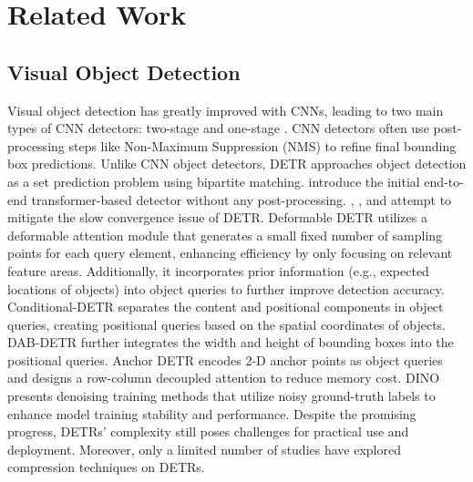 \section{Related Work}
\subsection{Visual Object Detection}
Visual object detection has greatly improved with CNNs, leading to two main types of CNN detectors: two-stage \cite{ren2015faster, cai2018cascade, chu2020detection} and one-stage \cite{redmon2018yolov3, duan2019centernet, tian2019fcos, kong2020foveabox, li2020generalized}.
CNN detectors often use post-processing steps like Non-Maximum Suppression (NMS) to refine final bounding box predictions.
Unlike CNN object detectors, DETR approaches object detection as a set prediction problem using bipartite matching. \citet{carion2020end} introduce the initial end-to-end transformer-based detector without any post-processing.
\citet{dai2021dynamic}, \citet{gao2021fast}, and \citet{sun2021rethinking} attempt to mitigate the slow convergence issue of DETR. 
Deformable DETR \cite{zhu2020deformable} utilizes a deformable attention module that generates a small fixed number of sampling points for each query element, enhancing efficiency by only focusing on relevant feature areas. Additionally, it incorporates prior information (e.g., expected locations of objects) into object queries to further improve detection accuracy. Conditional-DETR \cite{meng2021conditional} separates the content and positional components in object queries, creating positional queries based on the spatial coordinates of objects. DAB-DETR \cite{liu2022dab} further integrates the width and height of bounding boxes into the positional queries. Anchor DETR \cite{wang2022anchor} encodes 2-D anchor points as object queries and designs a row-column decoupled attention to reduce memory cost. DINO \cite{zhang2023dino} presents denoising training methods that utilize noisy ground-truth labels to enhance model training stability and performance. Despite the promising progress, DETRs' complexity still poses challenges for practical use and deployment. Moreover, only a limited number of studies have explored compression techniques on DETRs.

